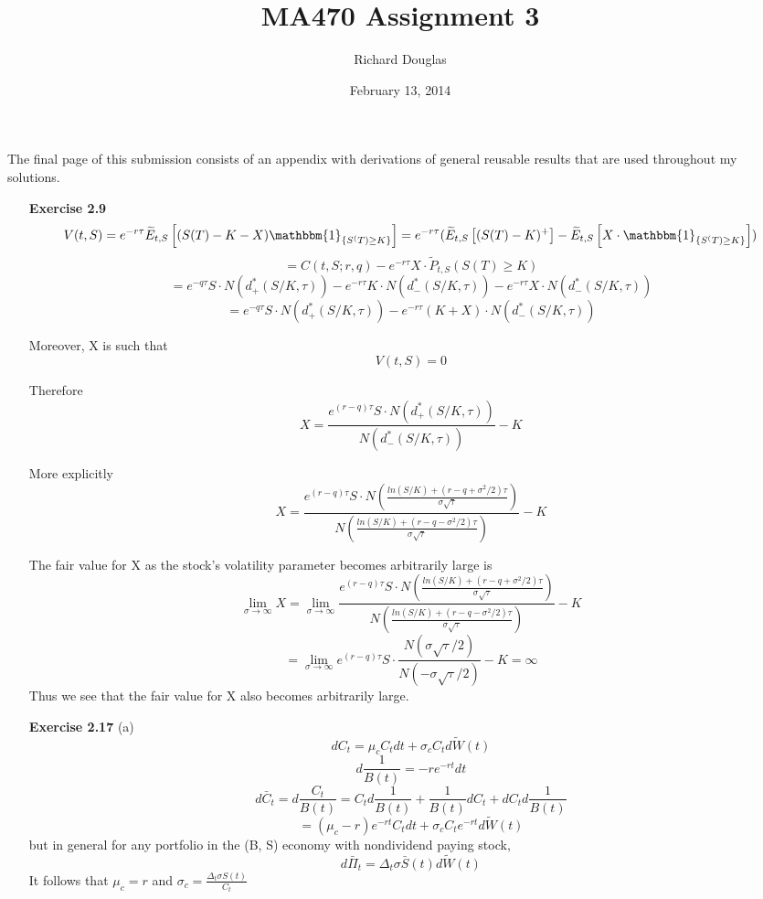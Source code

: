 \documentclass{article}[12pt,a4paper]
\title{MA470 Assignment 3}
\author{Richard Douglas}
\date{February 13,  2014} %
\begin{document}
  \maketitle
  The final page of this submission consists of an appendix with derivations of general reusable results that 
  are used throughout my solutions.\newline
  \begin{enumerate}
  \item[\textbf{Exercise 2.9}]
  $$V(t, S) = e^{-r\tau}\widetilde{E}_{t,  S} \left[ (S(T) - K - X) \mathbbm{1}_{\{ S^(T) \ge K \}} \right]
  = e^{-r\tau}(\widetilde{E}_{t, S} \left[ (S(T) - K)^{+}\right] - 
  	\widetilde{E}_{t, S} \left[ X \cdot  \mathbbm{1}_{\{ S^(T) \ge K \}} \right])$$
  $$= C(t, S; r, q) - e^{-r\tau}X\cdot \widetilde{P}_{t, S}(S(T) \ge K) $$
  $$= e^{-q\tau}S\cdot N(d^*_+(S/K, \tau)) - e^{-r\tau}K\cdot N(d^*_-(S/K,\tau))  - e^{-r\tau}X\cdot N(d^*_-(S/K,\tau))$$
  $$= e^{-q\tau}S\cdot N(d^*_+(S/K, \tau)) - e^{-r\tau}(K + X)\cdot N(d^*_-(S/K,\tau))$$
  
  Moreover, X is such that
  $$V(t,S) = 0$$
  
  Therefore
  $$X =  \frac{e^{(r - q)\tau} S\cdot N(d^*_+(S/K, \tau))}{ N(d^*_-(S/K,\tau))}  - K$$
  
  More explicitly
  $$X =  \frac{e^{(r - q)\tau} S \cdot N( \frac{ln(S/K) + (r - q + \sigma^2/2)\tau}{\sigma\sqrt\tau})}
  {N( \frac{ln(S/K) + (r - q - \sigma^2/2)\tau}{\sigma\sqrt\tau})} - K$$
  
  The fair value for X as the stock's volatility parameter becomes arbitrarily large is
  $$\lim_{\sigma \rightarrow \infty}{X} = 
  \lim_{\sigma \rightarrow \infty}{ \frac{e^{(r - q)\tau} S \cdot N( \frac{ln(S/K) + (r - q + \sigma^2/2)\tau}{\sigma\sqrt\tau})}
  {N( \frac{ln(S/K) + (r - q - \sigma^2/2)\tau}{\sigma\sqrt\tau})} -  K} $$
  $$= \lim_{\sigma \rightarrow \infty}{e^{(r - q)\tau} S \cdot \frac{ N(\sigma\sqrt\tau/2)}
  {N(- \sigma\sqrt\tau/2)} - K}   
  = \infty$$
  Thus we see that the fair value for X also becomes arbitrarily large.
  \pagebreak
  
  \item[\textbf{Exercise 2.17}]
  (a)
  $$dC_t = \mu_cC_tdt + \sigma_cC_td\widetilde{W}(t)$$
  $$d\frac{1}{B(t)} = -re^{-rt}dt$$
  $$d\bar{C}_t = d\frac{C_t}{B(t)} = C_td\frac{1}{B(t)} + \frac{1}{B(t)}dC_t + dC_td\frac{1}{B(t)}$$
  $$= (\mu_c - r)e^{-rt}C_tdt + \sigma_cC_te^{-rt}d\widetilde{W}(t)$$
  but in general for any portfolio in the (B, S) economy with nondividend paying stock,
  $$d\bar{\Pi}_t = \Delta_t\sigma\bar{S}(t)d\widetilde{W}(t)$$
  It follows that $\mu_c = r$ and $\sigma_c = \frac{\Delta_t\sigma  S(t)}{C_t}$
  

\end{enumerate}
\end{document}
